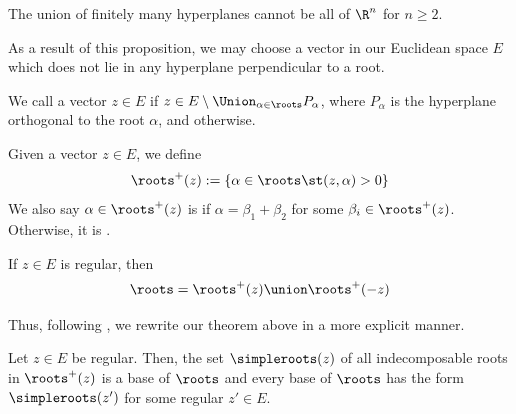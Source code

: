 \documentclass[11pt,leqno,oneside]{amsart}
\numberwithin{thm}{section}
\begin{document}
\begin{prop}
  The union of finitely many hyperplanes cannot be all of \(\R^n\) for
  \(n \geq 2\).
\end{prop}
As a result of this proposition, we may choose a vector in our
Euclidean space \(E\) which does not lie in any hyperplane
perpendicular to a root.
\begin{defn}
  We call a vector \(z \in E\)  if \(z \in E \setminus
  \Union_{\alpha \in \roots} P_\alpha\), where \(P_\alpha\) is the
  hyperplane orthogonal to the root \(\alpha\), and  otherwise.
\end{defn}
\begin{defn}
  Given a vector \(z \in E\), we define \[
    \roots^+(z) := \{\alpha \in \roots \st (z,\alpha) > 0\}
  \]
  We also say \(\alpha \in \roots^+(z)\) is  if
  \(\alpha = \beta_1 + \beta_2\)  for some \(\beta_i \in
  \roots^+(z)\). Otherwise, it is .
\end{defn}
\begin{prop}
  If \(z \in E\) is regular, then \[
    \roots = \roots^+(z) \union \roots^+(-z)
  \]
\end{prop}
Thus, following \cite{humph}, we rewrite our theorem above in a more
explicit manner.
\begin{thm}\label{regular-vec-and-base}
  Let \(z \in E\) be regular. Then, the set \(\simpleroots(z)\) of all
  indecomposable 
  roots in \(\roots^+(z)\) is a base of \(\roots\) and every base of
  \(\roots\) has the form \(\simpleroots(z')\) for some regular \(z'
  \in E\).
\end{thm}
\end{document}
